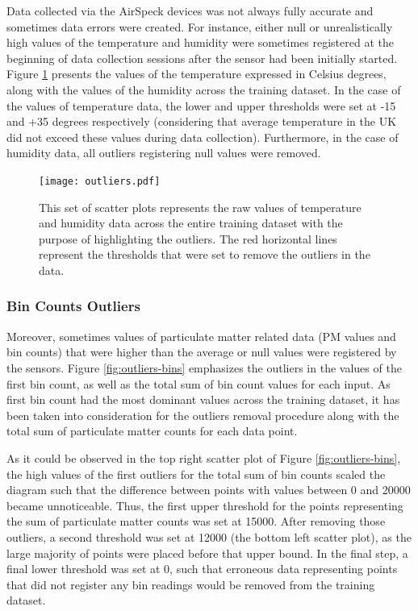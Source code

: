 \documentclass[bsc,frontabs,twoside,singlespacing, parskip,deptreport]{infthesis}     %
\begin{document}
Data collected via the AirSpeck devices was not always fully accurate and sometimes data errors were created. For instance, either null or unrealistically high values of the temperature and humidity were sometimes registered at the beginning of data collection sessions after the sensor had been initially started. Figure \ref{fig:outliers} presents the values of the temperature expressed in Celsius degrees, along with the values of the humidity across the training dataset. In the case of the values of temperature data, the lower and upper thresholds were set at -15 and +35 degrees respectively (considering that average temperature in the UK did not exceed these values during data collection). Furthermore, in the case of humidity data, all outliers registering null values were removed.

\begin{figure}[h!]
  \center
  \texttt{[image: outliers.pdf]}
  \caption{This set of scatter plots represents the raw values of temperature and humidity data across the entire training dataset with the purpose of highlighting the outliers. The red horizontal lines represent the thresholds that were set to remove the outliers in the data.}
  \label{fig:outliers}
\end{figure}

\subsubsection*{Bin Counts Outliers}

Moreover, sometimes values of particulate matter related data (PM values and bin counts) that were higher than the average or null values were registered by the sensors. Figure \ref{fig:outliers-bins} emphasizes the outliers in the values of the first bin count, as well as the total sum of bin count values for each input. As first bin count had the most dominant values across the training dataset, it has been taken into consideration for the outliers removal procedure along with the total sum of particulate matter counts for each data point.

As it could be observed in the top right scatter plot of Figure \ref{fig:outliers-bins}, the high values of the first outliers for the total sum of bin counts scaled the diagram such that the difference between points with values between 0 and 20000 became unnoticeable. Thus, the first upper threshold for the points representing the sum of particulate matter counts was set at 15000. After removing those outliers, a second threshold was set at 12000 (the bottom left scatter plot), as the large majority of points were placed before that upper bound. In the final step, a final lower threshold was set at 0, such that erroneous data representing points that did not register any bin readings would be removed from the training dataset.
\end{document}
